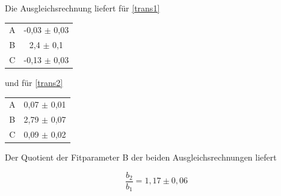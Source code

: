 Die Ausgleichsrechnung liefert für \ref{trans1}
\begin{table}[h!]
\centering
\begin{tabular}{cc} \toprule
\centering
A & -0,03 $\pm$ 0,03 \\
B & 2,4 $\pm$ 0,1 \\
C & -0,13 $\pm$ 0,03 \\
\bottomrule
\end{tabular}
\end{table}

und für \ref{trans2}

\begin{table}[h!]
\centering
\begin{tabular}{cc} \toprule
\centering
A & 0,07 $\pm$ 0,01 \\
B & 2,79 $\pm$ 0,07 \\
C & 0,09 $\pm$ 0,02 \\
\bottomrule
\end{tabular}
\end{table}

Der Quotient der Fitparameter B der beiden Ausgleichsrechnungen liefert

\begin{equation}
\frac{b_{2}}{b_{1}} = 1,17 \pm 0,06
\end{equation}
